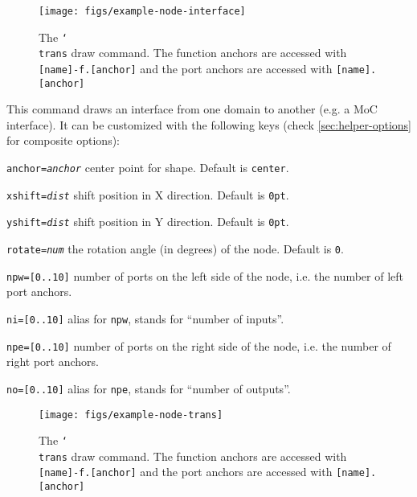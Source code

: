 \begin{figure}[htb]\centering
\texttt{[image: figs/example-node-interface]}

\caption{The \texttt{\char`\\trans} draw command. The function anchors are accessed with \texttt{[name]-f.[anchor]} and the port anchors are accessed with \texttt{[name].[anchor]}}
\end{figure}
\hspace{1pt}

\noindent This command draws an interface from one domain to another (e.g. a MoC interface). It can be customized with the following keys (check \ref{sec:helper-options} for composite options):

\begin{optionslist}
\item \texttt{anchor=\it anchor} center point for shape. Default is \texttt{center}.
\item \texttt{xshift=\it dist} shift position in X direction. Default is \texttt{0pt}.
\item \texttt{yshift=\it dist} shift position in Y direction. Default is \texttt{0pt}.
\item \texttt{rotate=\it num} the rotation angle (in degrees) of the node. Default is \texttt{0}.
\item \texttt{npw=[0..10]} number of ports on the left side of the node, i.e. the number of left port anchors.
\item \texttt{ni=[0..10]} alias for \texttt{npw}, stands for ``number of inputs''.
\item \texttt{npe=[0..10]} number of ports on the right side of the node, i.e. the number of right port anchors.
\item \texttt{no=[0..10]} alias for \texttt{npe}, stands for ``number of outputs''.
\end{optionslist}


\begin{figure}[htb]\centering
\texttt{[image: figs/example-node-trans]}

\caption{The \texttt{\char`\\trans} draw command. The function anchors are accessed with \texttt{[name]-f.[anchor]} and the port anchors are accessed with \texttt{[name].[anchor]}}
\end{figure}
\hspace{1pt}

